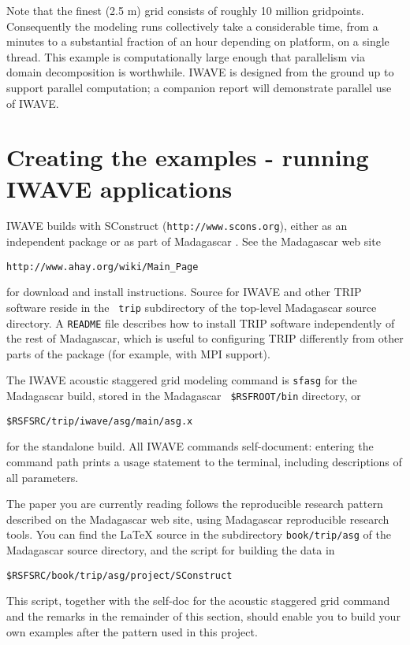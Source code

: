 Note that the finest (2.5 m) grid consists of roughly 10 million
gridpoints. Consequently the modeling runs collectively take a
considerable time, from a minutes to a substantial fraction of an hour
depending on platform,
on a single thread. This example is computationally large enough that
parallelism via domain decomposition is worthwhile. IWAVE is designed
from the ground up to support parallel computation; a companion report
will demonstrate parallel use of IWAVE.

\section{Creating the examples - running IWAVE applications}
IWAVE builds with SConstruct ({\tt http://www.scons.org}), either as an
independent package or as part of Madagascar
\cite[]{Madagascar}. See the Madagascar web site 
\begin{verbatim}
http://www.ahay.org/wiki/Main_Page
\end{verbatim}
for download and install
instructions. Source for IWAVE and other TRIP software reside in the {\tt
  trip} subdirectory of the top-level Madagascar source directory. A
{\tt README} file describes how to install TRIP software independently
of the rest of Madagascar, which is useful to configuring TRIP
differently from other parts of the package (for example, with MPI support). 

The IWAVE acoustic staggered grid modeling command is
{\tt sfasg} for the Madagascar build, stored in the Madagascar {\tt
  \$RSFROOT/bin} directory, or 
\begin{verbatim}
$RSFSRC/trip/iwave/asg/main/asg.x
\end{verbatim}
for the standalone build. All
IWAVE commands self-document: entering the command path prints a usage
statement to the terminal, including descriptions of all parameters.

The paper you are currently reading follows the reproducible research pattern described on
the Madagascar web site, using Madagascar reproducible research tools. You can find the LaTeX source in the
subdirectory {\tt book/trip/asg} of the Madagascar source directory,
and the script for building the data in 
\begin{verbatim}
$RSFSRC/book/trip/asg/project/SConstruct
\end{verbatim} 
This script, together with the
self-doc for the acoustic staggered grid command and the remarks in
the remainder of this section, should enable you to
build your own examples after the pattern used in this project.


